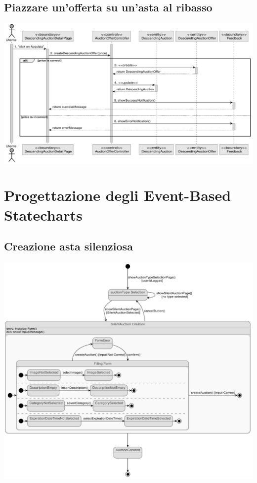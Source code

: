 \subsection{Piazzare un'offerta su un'asta al ribasso}
\includegraphics[width=\textwidth]{assets/sequence/piazzare_offerta_a_ribasso.pdf}
\newpage

\section{Progettazione degli Event-Based Statecharts}
\subsection{Creazione asta silenziosa}
\includegraphics[width=\textwidth]{assets/state_charts/creazione_asta_silenziosa.pdf}
\newpage

